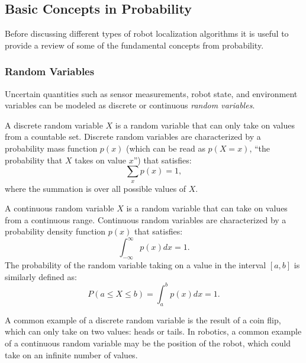 \subsection{Basic Concepts in Probability}
Before discussing different types of robot localization algorithms it is useful to provide a review of some of the fundamental concepts from probability. 

\subsubsection{Random Variables}
Uncertain quantities such as sensor measurements, robot state, and environment variables can be modeled as discrete or continuous \textit{random variables}.
\begin{definition}
A discrete random variable $X$ is a random variable that can only take on values from a countable set. Discrete random variables are characterized by a probability mass function $p(x)$ (which can be read as $p(X=x)$, ``the probability that $X$ takes on value $x$'') that satisfies:
\begin{equation*}
    \sum_x p(x) = 1,
\end{equation*}
where the summation is over all possible values of $X$.
\end{definition}
\begin{definition}
A continuous random variable $X$ is a random variable that can take on values from a continuous range. Continuous random variables are characterized by a probability density function $p(x)$ that satisfies:
\begin{equation*}
    \int_{-\infty}^\infty p(x) dx = 1.
\end{equation*}
The probability of the random variable taking on a value in the interval $[a,b]$ is similarly defined as:
\begin{equation*}
    P(a \leq X \leq b) = \int_{a}^b p(x) dx = 1.
\end{equation*}
\end{definition}
A common example of a discrete random variable is the result of a coin flip, which can only take on two values: heads or tails. In robotics, a common example of a continuous random variable may be the position of the robot, which could take on an infinite number of values.

